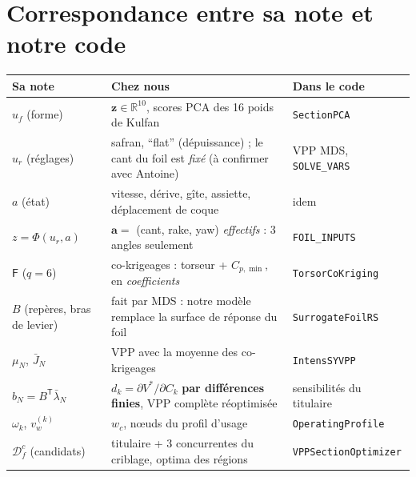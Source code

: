 \documentclass[11pt,a4paper]{article}
\newcommand{\vz}{\bm{z}}
\newcommand{\va}{\bm{a}}
\newcommand{\py}[1]{\texttt{#1}}
\newcommand{\F}{\mathsf{F}}
\newcommand{\tp}{^{\mathsf{T}}}
\begin{document}
\section{Correspondance entre sa note et notre code}
{\small
\begin{tabularx}{\linewidth}{@{}>{\raggedright\arraybackslash}p{3.0cm}>{\raggedright\arraybackslash}X>{\raggedright\arraybackslash}p{4.4cm}@{}}
\toprule
Sa note & Chez nous & Dans le code \\
\midrule
$u_f$ (forme) & $\vz\in\mathbb R^{10}$, scores PCA des 16 poids de Kulfan & \py{SectionPCA} \\
$u_r$ (réglages) & safran, \enquote{flat} (dépuissance) ; le cant du foil est \emph{fixé} (à confirmer avec Antoine) & VPP MDS, \py{SOLVE\_VARS} \\
$a$ (état) & vitesse, dérive, gîte, assiette, déplacement de coque & idem \\
$z=\Phi(u_r,a)$ & $\va=$ (cant, rake, yaw) \emph{effectifs} : 3 angles seulement & \py{FOIL\_INPUTS} \\
$\F$ ($q=6$) & 7 co-krigeages : torseur + $C_{p,\min}$, en \emph{coefficients} & \py{TorsorCoKriging} \\
$B$ (repères, bras de levier) & fait par MDS : notre modèle remplace la surface de réponse du foil & \py{SurrogateFoilRS} \\
$\mu_N$, $\bar J_N$ & VPP avec la moyenne des co-krigeages & \py{IntensSYVPP} \\
$b_N=B\tp\bar\lambda_N$ & $d_k=\partial V^\ast/\partial C_k$ \textbf{par différences finies}, VPP complète réoptimisée & sensibilités du titulaire \\
$\omega_k$, $v_w^{(k)}$ & $w_c$, nœuds du profil d'usage & \py{OperatingProfile} \\
$\mathcal D_f^c$ (candidats) & titulaire + 3 concurrentes du criblage, optima des régions & \py{VPPSectionOptimizer} \\
\bottomrule
\end{tabularx}}
\end{document}
